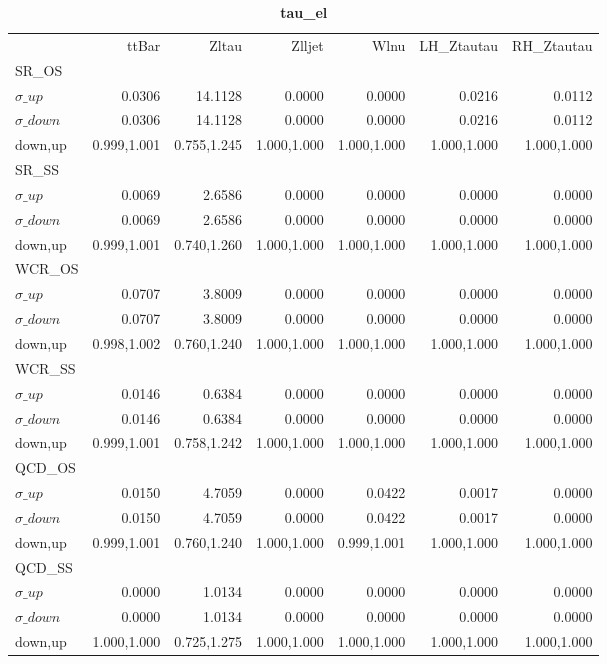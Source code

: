 \documentclass[11pt,oneside,a4paper]{article}
\begin{document}
\begin{table}
\centering
\caption{\bf{tau\_el}}
\begin{tabular}{lrrrrrr}
 & ttBar & Zltau & Zlljet & Wlnu & LH\_Ztautau & RH\_Ztautau \\
SR\_OS &  &  &  &  &  &  \\
$\sigma\_up$ & 0.0306 & 14.1128 & 0.0000 & 0.0000 & 0.0216 & 0.0112 \\
$\sigma\_down$ & 0.0306 & 14.1128 & 0.0000 & 0.0000 & 0.0216 & 0.0112 \\
down,up & 0.999,1.001 & 0.755,1.245 & 1.000,1.000 & 1.000,1.000 & 1.000,1.000 & 1.000,1.000 \\

\hline
SR\_SS &  &  &  &  &  &  \\
$\sigma\_up$ & 0.0069 & 2.6586 & 0.0000 & 0.0000 & 0.0000 & 0.0000 \\
$\sigma\_down$ & 0.0069 & 2.6586 & 0.0000 & 0.0000 & 0.0000 & 0.0000 \\
down,up & 0.999,1.001 & 0.740,1.260 & 1.000,1.000 & 1.000,1.000 & 1.000,1.000 & 1.000,1.000 \\

\hline
WCR\_OS &  &  &  &  &  &  \\
$\sigma\_up$ & 0.0707 & 3.8009 & 0.0000 & 0.0000 & 0.0000 & 0.0000 \\
$\sigma\_down$ & 0.0707 & 3.8009 & 0.0000 & 0.0000 & 0.0000 & 0.0000 \\
down,up & 0.998,1.002 & 0.760,1.240 & 1.000,1.000 & 1.000,1.000 & 1.000,1.000 & 1.000,1.000 \\

\hline
WCR\_SS &  &  &  &  &  &  \\
$\sigma\_up$ & 0.0146 & 0.6384 & 0.0000 & 0.0000 & 0.0000 & 0.0000 \\
$\sigma\_down$ & 0.0146 & 0.6384 & 0.0000 & 0.0000 & 0.0000 & 0.0000 \\
down,up & 0.999,1.001 & 0.758,1.242 & 1.000,1.000 & 1.000,1.000 & 1.000,1.000 & 1.000,1.000 \\

\hline
QCD\_OS &  &  &  &  &  &  \\
$\sigma\_up$ & 0.0150 & 4.7059 & 0.0000 & 0.0422 & 0.0017 & 0.0000 \\
$\sigma\_down$ & 0.0150 & 4.7059 & 0.0000 & 0.0422 & 0.0017 & 0.0000 \\
down,up & 0.999,1.001 & 0.760,1.240 & 1.000,1.000 & 0.999,1.001 & 1.000,1.000 & 1.000,1.000 \\

\hline
QCD\_SS &  &  &  &  &  &  \\
$\sigma\_up$ & 0.0000 & 1.0134 & 0.0000 & 0.0000 & 0.0000 & 0.0000 \\
$\sigma\_down$ & 0.0000 & 1.0134 & 0.0000 & 0.0000 & 0.0000 & 0.0000 \\
down,up & 1.000,1.000 & 0.725,1.275 & 1.000,1.000 & 1.000,1.000 & 1.000,1.000 & 1.000,1.000 \\

\hline
\end{tabular}
\end{table}
\end{document}
